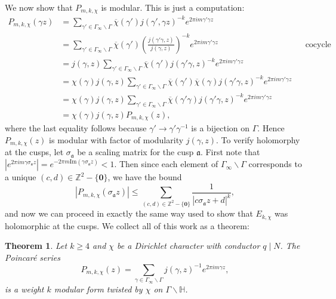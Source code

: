 \documentclass[12pt]{book}
\newtheorem{theorem}{Theorem}[section]
\theoremstyle{definition}\newframedtheorem{method}{Method}
\newcommand{\mf}{\mathfrak}
\newcommand{\Z}{\mathbb{Z}}
\renewcommand{\H}{\mathbb{H}}
\newcommand{\g}{\gamma}
\newcommand{\s}{\sigma}
\newcommand{\G}{\Gamma}
\newcommand{\<}{\langle}
\renewcommand{\>}{\rangle}
\newcommand{\conj}{\overline}
\newcommand{\cchi}{\conj{\chi}}
\renewcommand{\Im}{\mathrm{Im}}
\newcommand{\GH}{\G\backslash\H}
\newcommand{\GG}{\G_{\infty}\backslash\G}
\begin{document}
      We now show that $P_{m,k,\chi}$ is modular. This is just a computation:
      \begin{align*}
        P_{m,k,\chi}(\g z) &= \sum_{\g' \in \GG}\cchi(\g')j(\g',\g z)^{-k}e^{2\pi im\g'\g z} \\
        &= \sum_{\g' \in \GG}\cchi(\g')\left(\frac{j(\g'\g,z)}{j(\g,z)}\right)^{-k}e^{2\pi im\g'\g z} && \text{cocycle condition} \\
        &= j(\g,z)\sum_{\g' \in \GG}\cchi(\g')j(\g'\g,z)^{-k}e^{2\pi im\g'\g z} \\
        &= \chi(\g)j(\g,z)\sum_{\g' \in \GG}\cchi(\g')\cchi(\g)j(\g'\g,z)^{-k}e^{2\pi im\g'\g z} \\
        &= \chi(\g)j(\g,z)\sum_{\g' \in \GG}\cchi(\g'\g)j(\g'\g,z)^{-k}e^{2\pi im\g'\g z} \\
        &= \chi(\g)j(\g,z)P_{m,k,\chi}(z),
      \end{align*}
      where the last equality follows because $\g' \to \g'\g^{-1}$ is a bijection on $\G$. Hence $P_{m,k,\chi}(z)$ is modular with factor of modularity $j(\g,z)$. To verify holomorphy at the cusps, let $\s_{\mf{a}}$ be a scaling matrix for the cusp $\mf{a}$. First note that $|e^{2\pi im\g\s_{\mf{a}}z}| = e^{-2\pi m\Im(\g\s_{\mf{a}}z)} < 1$. Then since each element of $\GG$ corresponds to a unique $(c,d) \in \Z^{2}-\{\mathbf{0}\}$, we have the bound
      \[
        |P_{m,k,\chi}(\s_{\mf{a}}z)| \le \sum_{(c,d) \in \Z^{2}-\{\mathbf{0}\}}\frac{1}{|c\s_{\mf{a}}z+d|^{k}},
      \]
      and now we can proceed in exactly the same way used to show that $E_{k,\chi}$ was holomorphic at the cusps. We collect all of this work as a theorem:

      \begin{theorem}
        Let $k \ge 4$ and $\chi$ be a Dirichlet character with conductor $q \mid N$. The Poincar\'e series
        \[
          P_{m,k,\chi}(z) = \sum_{\g \in \GG}j(\g,z)^{-1}e^{2\pi im\g z},
        \]
        is a weight $k$ modular form twisted by $\chi$ on $\GH$.
      \end{theorem}
\end{document}
